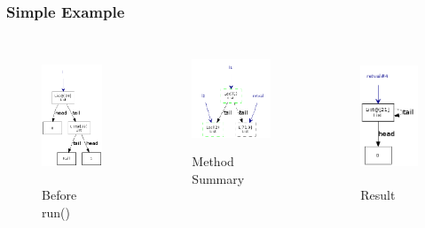 \documentclass[hyperref={pdfpagelabels=false}]{beamer}
\begin{document}
\begin{frame}[fragile]
\frametitle{Simple Example}
  \begin{columns}
    \begin{column}{0.3\textwidth}
      \begin{figure}[t]
        \includegraphics[height=40mm]{images/bef.png}\\
        Before run()
      \end{figure}
    \end{column}
    \begin{column}{0.4\textwidth}
      \begin{figure}[t]
        \includegraphics[height=30mm]{images/run_sum.png}\\
        Method Summary
      \end{figure}
    \end{column}
    \begin{column}{0.3\textwidth}
      \begin{figure}[t]
        \includegraphics[height=40mm]{images/aft.png}\\
        Result
      \end{figure}
    \end{column}
  \end{columns}
\end{frame}
\end{document}

